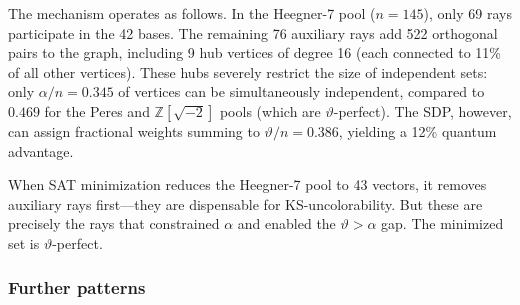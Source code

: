 \documentclass[12pt,a4paper]{article}
\newcommand{\Z}{\mathbb{Z}}
\begin{document}
The mechanism operates as follows. In the Heegner-7 pool ($n = 145$), only 69 rays participate in the 42 bases. The remaining 76 auxiliary rays add 522 orthogonal pairs to the graph, including 9 hub vertices of degree 16 (each connected to 11\% of all other vertices). These hubs severely restrict the size of independent sets: only $\alpha/n = 0.345$ of vertices can be simultaneously independent, compared to $0.469$ for the Peres and $\Z[\sqrt{-2}]$ pools (which are $\vartheta$-perfect). The SDP, however, can assign fractional weights summing to $\vartheta/n = 0.386$, yielding a 12\% quantum advantage.

When SAT minimization reduces the Heegner-7 pool to 43 vectors, it removes auxiliary rays first---they are dispensable for KS-uncolorability. But these are precisely the rays that constrained $\alpha$ and enabled the $\vartheta > \alpha$ gap. The minimized set is $\vartheta$-perfect.

\subsubsection{Further patterns}
\end{document}
